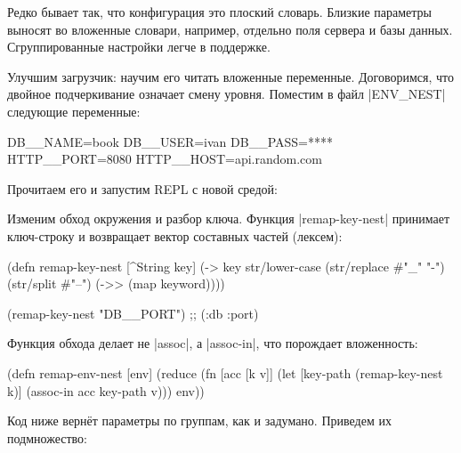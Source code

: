 Редко бывает так, что конфигурация это плоский словарь. Близкие параметры
выносят во вложенные словари, например, отдельно поля сервера и базы
данных. Сгруппированные настройки легче в поддержке.

Улучшим загрузчик: научим его читать вложенные переменные. Договоримся, что
двойное подчеркивание означает смену уровня. Поместим в файл \spverb|ENV_NEST|
следующие переменные:

\begin{english}
  \begin{bash}
DB__NAME=book
DB__USER=ivan
DB__PASS=****
HTTP__PORT=8080
HTTP__HOST=api.random.com
  \end{bash}
\end{english}


\noindent
Прочитаем его и запустим REPL с новой средой:

\begin{english}
\end{english}

Изменим обход окружения и разбор ключа. Функция \spverb|remap-key-nest|
принимает ключ-строку и возвращает вектор составных частей (лексем):

\begin{english}
  \begin{clojure}
(defn remap-key-nest
  [^String key]
  (-> key
      str/lower-case
      (str/replace #"_" "-")
      (str/split #"--")
      (->> (map keyword))))

(remap-key-nest "DB__PORT")
;; (:db :port)
  \end{clojure}
\end{english}


Функция обхода делает не \spverb|assoc|, а \spverb|assoc-in|, что порождает
вложенность:

\begin{english}
  \begin{clojure}
(defn remap-env-nest
  [env]
  (reduce
   (fn [acc [k v]]
     (let [key-path (remap-key-nest k)]
       (assoc-in acc key-path v)))
   {}
   env))
  \end{clojure}
\end{english}

Код ниже верн\"{е}т параметры по группам, как и задумано. Приведем их подмножество:

